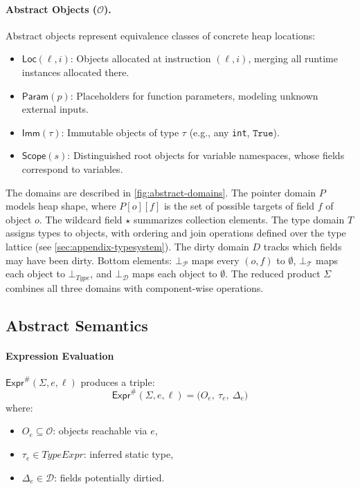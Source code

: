 \paragraph{Abstract Objects ($\mathcal{O}$).}
Abstract objects represent equivalence classes of concrete heap locations:
\begin{itemize}
    \item $\mathsf{Loc}(\ell,i)$: Objects allocated at instruction $(\ell,i)$, merging all runtime instances allocated there.
    \item $\mathsf{Param}(p)$: Placeholders for function parameters, modeling unknown external inputs.
    \item $\mathsf{Imm}(\tau)$: Immutable objects of type $\tau$ (e.g., any \texttt{int}, $\mathtt{True}$).
    \item $\mathsf{Scope}(s)$: Distinguished root objects for variable namespaces, whose fields correspond to variables.
\end{itemize}

The domains are described in \autoref{fig:abstract-domains}. The pointer domain $P$ models heap shape, where $P[o][f]$ is the set of possible targets of field $f$ of object $o$. The wildcard field $\star$ summarizes collection elements. The type domain $T$ assigns types to objects, with ordering and join operations defined over the type lattice (see \autoref{sec:appendix-typesystem}). The dirty domain $D$ tracks which fields may have been dirty. Bottom elements: $\bot_\mathcal{P}$ maps every $(o,f)$ to $\emptyset$, $\bot_{\mathcal{T}}$ maps each object to $\bot_{\mathit{Type}}$, and $\bot_\mathcal{D}$ maps each object to $\emptyset$. The reduced product $\Sigma$ combines all three domains with component-wise operations.

\subsection{Abstract Semantics}

\paragraph{Expression Evaluation} $\mathsf{Expr}^\#(\Sigma, e, \ell)$ produces a triple:
\[
\mathsf{Expr}^\#(\Sigma, e, \ell) = \big(O_e,\ \tau_e,\ \Delta_e\big)
\]
where:
\begin{itemize}
    \item $O_e \subseteq \mathcal{O}$: objects reachable via $e$,
    \item $\tau_e \in \mathit{TypeExpr}$: inferred static type,
    \item $\Delta_e \in \mathcal{D}$: fields potentially dirtied.
\end{itemize}

